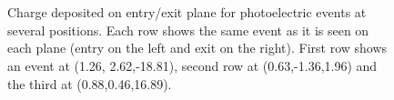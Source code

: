 \begin{figure}[H]
{		\label{fig.photoelectricD}
	}\\
	\vspace{-0.5cm}
	\\
	\caption{ \label{fig.photoelectric} Charge deposited on entry/exit plane for photoelectric events at several positions. Each row shows the same event as it is seen on each plane (entry on the left and exit on the right). First row shows an event at (1.26, 2.62,-18.81), second row at (0.63,-1.36,1.96) and the third at (0.88,0.46,16.89).}
\end{figure}

